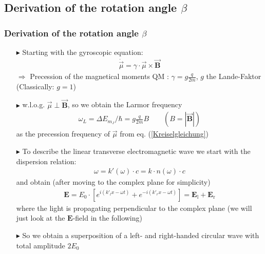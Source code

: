 \documentclass[11pt,a4paper]{beamer}
\begin{document}
\begin{frame}
\subsection{Derivation of the rotation angle $\beta$}
\frametitle{Derivation of the rotation angle $\beta$}
\begin{itemize}
\item[$\blacktriangleright$]
Starting with the gyroscopic equation:
\begin{align}
\dot{\vec{\mu}} = \gamma\cdot\vec{\mu}\times\vec{\textbf{B}}
\label{Kreiselgleichung}
\end{align}
$\Rightarrow$ Precession of the magnetical moments
\newline \newline
QM : $\gamma = g\frac{q}{2m}$, $g$ the Lande-Faktor
(Classically: $g=1$)\newline \newline
\item[$\blacktriangleright$]
w.l.o.g. $\vec{\mu} \perp \vec{\textbf{B}}$, so we obtain the Larmor frequency
\begin{align}
\omega_L = \Delta E_{m_J}/ \hbar = g\frac{q}{2m}B \qquad (B = |\vec{\textbf{B}}|)
\label{Larmorfrequenz}
\end{align}
as the precession frequency of $\vec{\mu}$ from eq. (\ref{Kreiselgleichung})
\end{itemize}
\end{frame}
\begin{frame}
\begin{itemize}
\item[$\blacktriangleright$]
To describe the linear transverse electromagnetic wave we start with the dispersion relation:
\begin{align}
\omega = k'(\omega)\cdot c = k\cdot n(\omega)\cdot c
\label{Dispersionsrelation}
\end{align}
and obtain (after moving to the complex plane for simplicity)
 \begin{align}
\textbf{E} = E_0\cdot[e^{i( k'_l x - \omega t)}+e^{-i( k'_r x - \omega t )}] = \textbf{E}_{\text{l}} + \textbf{E}_{\text{r}}
\label{Lichtwelle_1}
 \end{align} 
where the light is propagating perpendicular to the complex plane (we will just look at the $\textbf{E}$-field in the following)\newline
\item[$\blacktriangleright$] So we obtain a superposition of a left- and right-handed circular wave with total amplitude $2E_0$
\end{itemize}
\end{frame}
\end{document}
